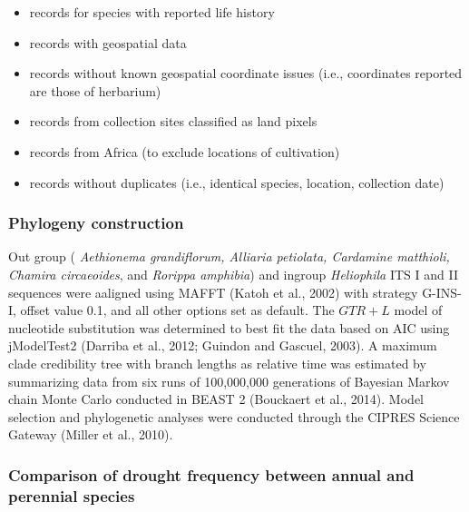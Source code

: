 \documentclass[man,floatsintext]{apa6}
\providecommand{\tightlist}{%
  \setlength{\itemsep}{0pt}\setlength{\parskip}{0pt}}
\theoremstyle{definition}
\theoremstyle{definition}
\theoremstyle{definition}
\theoremstyle{remark}
\begin{document}
\begin{itemize}
\tightlist
\item
  records for species with reported life history\\
\item
  records with geospatial data\\
\item
  records without known geospatial coordinate issues (i.e., coordinates
  reported are those of herbarium)\\
\item
  records from collection sites classified as land pixels\\
\item
  records from Africa (to exclude locations of cultivation)
\item
  records without duplicates (i.e., identical species, location,
  collection date)
\end{itemize}

\hypertarget{phylogeny-construction}{%
\subsubsection{Phylogeny construction}\label{phylogeny-construction}}

Out group ( \emph{Aethionema grandiflorum, Alliaria petiolata, Cardamine
matthioli, Chamira circaeoides}, and \emph{Rorippa amphibia}) and
ingroup \emph{Heliophila} ITS I and II sequences were aaligned using
MAFFT (Katoh et al., 2002) with strategy G-INS-I, offset value 0.1, and
all other options set as default. The \(GTR + L\) model of nucleotide
substitution was determined to best fit the data based on AIC using
jModelTest2 (Darriba et al., 2012; Guindon and Gascuel, 2003). A maximum
clade credibility tree with branch lengths as relative time was
estimated by summarizing data from six runs of 100,000,000 generations
of Bayesian Markov chain Monte Carlo conducted in BEAST 2 (Bouckaert et
al., 2014). Model selection and phylogenetic analyses were conducted
through the CIPRES Science Gateway (Miller et al., 2010).

\hypertarget{comparison-of-drought-frequency-between-annual-and-perennial-species}{%
\subsubsection{Comparison of drought frequency between annual and
perennial
species}\label{comparison-of-drought-frequency-between-annual-and-perennial-species}}
\end{document}
